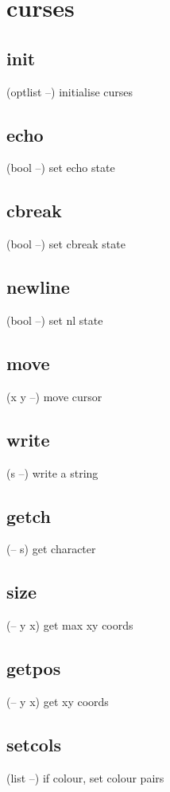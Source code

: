 \section{curses}
\subsection{init}
(optlist --) initialise curses 


\subsection{echo}
(bool --) set echo state


\subsection{cbreak}
(bool --) set cbreak state


\subsection{newline}
(bool --) set nl state


\subsection{move}
(x y --) move cursor


\subsection{write}
(s --) write a string


\subsection{getch}
(-- s) get character


\subsection{size}
(-- y x) get max xy coords


\subsection{getpos}
(-- y x) get xy coords


\subsection{setcols}
(list --) if colour, set colour pairs

